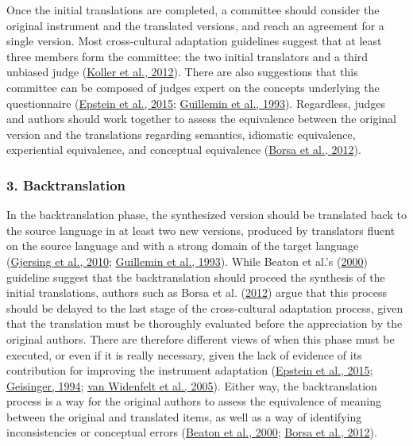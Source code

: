 \documentclass[
  ,doc,11pt, twoside,floatsintext]{apa6}
\begin{document}
Once the initial translations are completed, a committee should consider the original instrument and the translated versions, and reach an agreement for a single version. Most cross-cultural adaptation guidelines suggest that at least three members form the committee: the two initial translators and a third unbiased judge (\protect\hyperlink{ref-koller2012}{Koller et al., 2012}). There are also suggestions that this committee can be composed of judges expert on the concepts underlying the questionnaire (\protect\hyperlink{ref-epstein2015}{Epstein et al., 2015}; \protect\hyperlink{ref-guillemin1993}{Guillemin et al., 1993}). Regardless, judges and authors should work together to assess the equivalence between the original version and the translations regarding semantics, idiomatic equivalence, experiential equivalence, and conceptual equivalence (\protect\hyperlink{ref-borsaAdaptacaoValidacaoInstrumentos2012}{Borsa et al., 2012}).

\hypertarget{backtranslation}{%
\subsubsection{3. Backtranslation}\label{backtranslation}}

In the backtranslation phase, the synthesized version should be translated back to the source language in at least two new versions, produced by translators fluent on the source language and with a strong domain of the target language (\protect\hyperlink{ref-gjersing2010}{Gjersing et al., 2010}; \protect\hyperlink{ref-guillemin1993}{Guillemin et al., 1993}). While Beaton et al.'s (\protect\hyperlink{ref-beaton2000}{2000}) guideline suggest that the backtranslation should proceed the synthesis of the initial translations, authors such as Borsa et al. (\protect\hyperlink{ref-borsaAdaptacaoValidacaoInstrumentos2012}{2012}) argue that this process should be delayed to the last stage of the cross-cultural adaptation process, given that the translation must be thoroughly evaluated before the appreciation by the original authors. There are therefore different views of when this phase must be executed, or even if it is really necessary, given the lack of evidence of its contribution for improving the instrument adaptation (\protect\hyperlink{ref-epstein2015}{Epstein et al., 2015}; \protect\hyperlink{ref-geisinger1994}{Geisinger, 1994}; \protect\hyperlink{ref-vanwidenfelt2005}{van Widenfelt et al., 2005}). Either way, the backtranslation process is a way for the original authors to assess the equivalence of meaning between the original and translated items, as well as a way of identifying inconsistencies or conceptual errors (\protect\hyperlink{ref-beaton2000}{Beaton et al., 2000}; \protect\hyperlink{ref-borsaAdaptacaoValidacaoInstrumentos2012}{Borsa et al., 2012}).
\end{document}
